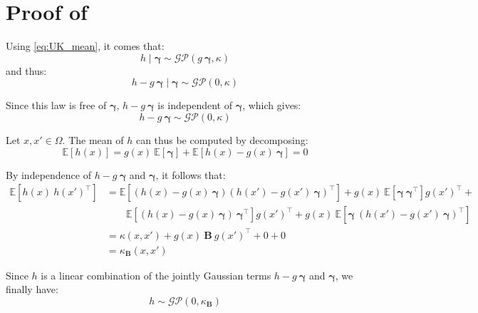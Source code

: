 \section[Proof of Proposition 3.10]{Proof of }\label{sec:proof_vague_prior}

Using \eqref{eq:UK_mean}, it comes that:
\begin{equation}
	h\mid\boldsymbol{\gamma}\sim\mathcal{GP}(g\:\boldsymbol{\gamma},\kappa)
\end{equation}
and thus:
\begin{equation}
	h-g\:\boldsymbol{\gamma}\mid\boldsymbol{\gamma}\sim\mathcal{GP}(0,\kappa)
\end{equation}

Since this law is free of $\boldsymbol{\gamma}$, $h-g\:\boldsymbol{\gamma}$ is independent of $\boldsymbol{\gamma}$, which gives:
\begin{equation}
	h-g\:\boldsymbol{\gamma}\sim\mathcal{GP}(0,\kappa)
\end{equation}

Let $x,x'\in\Omega$. The mean of $h$ can thus be computed by decomposing:
\begin{equation}
	\mathbb{E}[h(x)]=g(x)\:\mathbb{E}[\boldsymbol{\gamma}]+\mathbb{E}[h(x)-g(x)\:\boldsymbol{\gamma}]=0
\end{equation}

By independence of $h-g\:\boldsymbol{\gamma}$ and $\boldsymbol{\gamma}$, it follows that:
\begin{equation}
	\begin{aligned}
	\mathbb{E}\left[h(x)\:h(x')^\top\right]&=\mathbb{E}\left[(h(x)-g(x)\:\boldsymbol{\gamma})(h(x')-g(x')\:\boldsymbol{\gamma})^\top\right]+g(x)\:\mathbb{E}\left[\boldsymbol{\gamma}\:\boldsymbol{\gamma}^\top\right]g(x')^\top+\\
	&\qquad\mathbb{E}\left[(h(x)-g(x)\:\boldsymbol{\gamma})\:\boldsymbol{\gamma}^\top\right]g(x')^\top+g(x)\:\mathbb{E}\left[\boldsymbol{\gamma}\:(h(x')-g(x')\:\boldsymbol{\gamma})^\top\right]\\
	&=\kappa(x,x')+g(x)\:\mathbf{B}\:g(x')^\top+0+0\\
	&=\kappa_{\mathbf{B}}(x,x')
	\end{aligned}
\end{equation}

Since $h$ is a linear combination of the jointly Gaussian terms $h-g\:\boldsymbol{\gamma}$ and $\boldsymbol{\gamma}$, we finally have:
\begin{equation}
	h\sim\mathcal{GP}(0,\kappa_{\mathbf{B}})
\end{equation}

